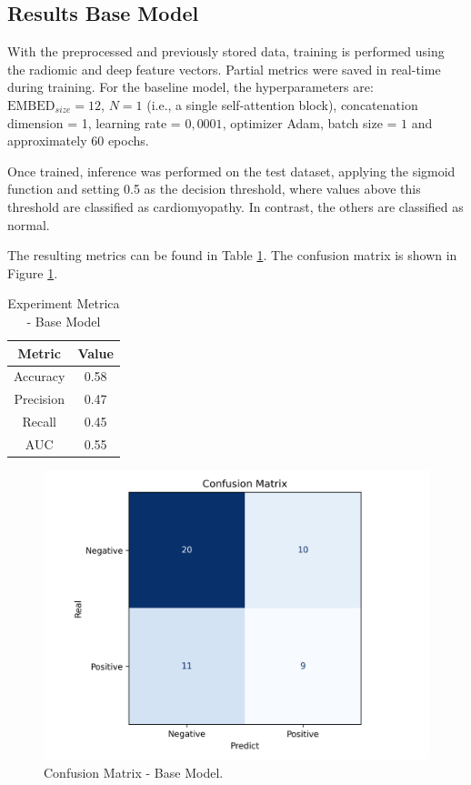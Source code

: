 \documentclass[journal,twoside,web]{ieeecolor}
\begin{document}
\subsection{Results Base Model}

With the preprocessed and previously stored data, training is performed using the radiomic and deep feature vectors. Partial metrics were saved in real-time during training.  For the baseline model, the hyperparameters are: $\text{EMBED}_{size} = 12$, $N = 1$ (i.e., a single self-attention block), concatenation dimension = 1, learning rate = $0,0001$, optimizer Adam, batch size = $1$ and approximately $60$ epochs.

Once trained, inference was performed on the test dataset, applying the sigmoid function and setting 0.5 as the decision threshold, where values above this threshold are classified as cardiomyopathy. In contrast, the others are classified as normal.  

The resulting metrics can be found in Table \ref{tab:metrics}. The confusion matrix is shown in Figure \ref{fig05}.

\begin{table}[h!]
    \centering
    \caption{Experiment Metrica - Base Model}
    \begin{tabular}{|c|c|}
    \hline 
          \textbf{Metric} & \textbf{Value} \\ 
    \hline 
        Accuracy & 0.58 \\ 
    \hline 
        Precision & 0.47 \\ 
    \hline 
        Recall & 0.45 \\ 
    \hline 
        AUC & 0.55 \\ 
    \hline 
    \end{tabular} 
    \label{tab:metrics}
\end{table}

\begin{figure}[h]
    \centerline{\includegraphics[width=\columnwidth]{figures/fig05.png}}
    \caption{Confusion Matrix -  Base Model.}
    \label{fig05}
\end{figure}
\end{document}
